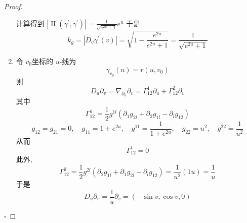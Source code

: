 \documentclass[../../main.tex]{subfiles}
\begin{document}
\begin{proof}
\begin{enumerate}
\[        \] 计算得到 \(  \left| \operatorname{II} \left(  \gamma ^{\prime} , \gamma ^{\prime}  \right)  \right|= \frac{1 }{\sqrt{e^{2u}+ 1} }e^{u}    \) 于是 \[
        k_{g}= \left| D_{v} \gamma ^{\prime} \left( v \right)  \right|= \sqrt{1- \frac{e^{2u} }{e^{2u}+ 1 } }= \frac{1 }{\sqrt{e^{2u}+ 1} }  
        \]
        \item 令  \(  v_0  \)坐标的 \(  u  \)-线为 \[
         \gamma _{v_0}\left( u \right)= r\left( u,v_0 \right)  
        \]  则 \[
        D_{u} \partial _{v}=  \nabla _{ \partial _{u}} \partial _{v}=   \Gamma _{12}^{1} \partial _{u}+  \Gamma _{12}^{2} \partial _{v}
        \]其中 \[
         \Gamma _{12}^{1}= \frac{1}{2}g^{1l}\left(  \partial _{1}g_{2l}+  \partial _{2}g_{1l}- \partial _{l}g_{12} \right)
        \]   \[
        g_{12}= g_{21}= 0,\quad g_{11}= 1+ e^{2u},\quad  g^{11}= \frac{1 }{1+ e^{2u} } ,\quad g_{22}=  u^{2}, \quad g^{22}= \frac{1 }{u^{2} } 
        \]从而 \[
         \Gamma _{12}^{l}= 0
        \]此外, \[
         \Gamma _{12}^{2}=\frac{1}{2} g^{2l}\left(  \partial _{2}g_{1l}+  \partial _{1}g_{2l}- \partial _{l}g_{12} \right)= \frac{1 }{u^{2} }\left( 1u \right)= \frac{1 }{u }    
        \]于是 \[
        D_{u} \partial _{v}= \frac{1 }{u } \partial _{v}= \left( -\sin v,\cos v,0 \right)  
        \]
    \end{enumerate}
    

    \hfill $\square$
\end{proof}
\end{document}
